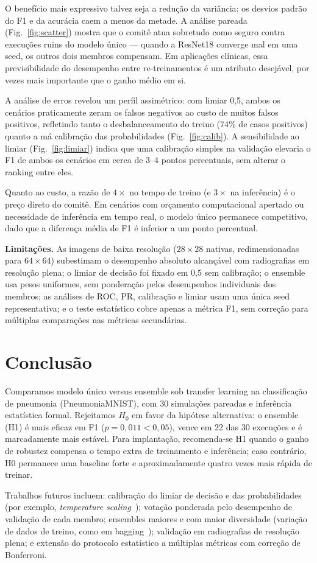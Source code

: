 \documentclass[conference]{IEEEtran}
\begin{document}
O benefício mais expressivo talvez seja a redução da variância: os desvios padrão do F1 e da acurácia caem a menos da metade. A análise pareada (Fig.~\ref{fig:scatter}) mostra que o comitê atua sobretudo como seguro contra execuções ruins do modelo único --- quando a ResNet18 converge mal em uma seed, os outros dois membros compensam. Em aplicações clínicas, essa previsibilidade do desempenho entre re-treinamentos é um atributo desejável, por vezes mais importante que o ganho médio em si.

A análise de erros revelou um perfil assimétrico: com limiar 0,5, ambos os cenários praticamente zeram os falsos negativos ao custo de muitos falsos positivos, refletindo tanto o desbalanceamento do treino (74\% de casos positivos) quanto a má calibração das probabilidades (Fig.~\ref{fig:calib}). A sensibilidade ao limiar (Fig.~\ref{fig:limiar}) indica que uma calibração simples na validação elevaria o F1 de ambos os cenários em cerca de 3--4 pontos percentuais, sem alterar o ranking entre eles.

Quanto ao custo, a razão de $4\times$ no tempo de treino (e $3\times$ na inferência) é o preço direto do comitê. Em cenários com orçamento computacional apertado ou necessidade de inferência em tempo real, o modelo único permanece competitivo, dado que a diferença média de F1 é inferior a um ponto percentual.

\textbf{Limitações.} As imagens de baixa resolução ($28\times28$ nativas, redimensionadas para $64\times64$) subestimam o desempenho absoluto alcançável com radiografias em resolução plena; o limiar de decisão foi fixado em 0,5 sem calibração; o ensemble usa pesos uniformes, sem ponderação pelos desempenhos individuais dos membros; as análises de ROC, PR, calibração e limiar usam uma única seed representativa; e o teste estatístico cobre apenas a métrica F1, sem correção para múltiplas comparações nas métricas secundárias.

\section{Conclusão}
Comparamos modelo único versus ensemble sob transfer learning na classificação de pneumonia (PneumoniaMNIST), com 30 simulações pareadas e inferência estatística formal. Rejeitamos $H_0$ em favor da hipótese alternativa: o ensemble (H1) é mais eficaz em F1 ($p=0{,}011 < 0{,}05$), vence em 22 das 30 execuções e é marcadamente mais estável. Para implantação, recomenda-se H1 quando o ganho de robustez compensa o tempo extra de treinamento e inferência; caso contrário, H0 permanece uma baseline forte e aproximadamente quatro vezes mais rápida de treinar.

Trabalhos futuros incluem: calibração do limiar de decisão e das probabilidades (por exemplo, \emph{temperature scaling}~\cite{guo2017calibration}); votação ponderada pelo desempenho de validação de cada membro; ensembles maiores e com maior diversidade (variação de dados de treino, como em bagging~\cite{breiman1996bagging}); validação em radiografias de resolução plena; e extensão do protocolo estatístico a múltiplas métricas com correção de Bonferroni.



\end{document}

